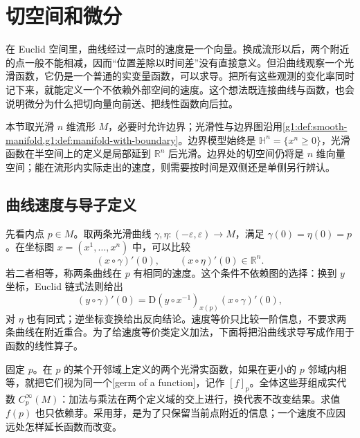 
% 
% 

\section{切空间和微分}
\label{g1:sec:1102}

在 Euclid 空间里，曲线经过一点时的速度是一个向量。换成流形以后，两个附近的点一般不能相减，因而“位置差除以时间差”没有直接意义。但沿曲线观察一个光滑函数，它仍是一个普通的实变量函数，可以求导。把所有这些观测的变化率同时记下来，就能定义一个不依赖外部空间的速度。这个想法既连接曲线与函数，也会说明微分为什么把切向量向前送、把线性函数向后拉。

\ProseParagraphBreak

本节取光滑 \(n\) 维流形 \(M\)，必要时允许边界；光滑性与边界图沿用\cref{g1:def:smooth-manifold,g1:def:manifold-with-boundary}。边界模型始终是 \(\mathbb H^n=\{x^n\ge0\}\)，光滑函数在半空间上的定义是局部延到 \(\mathbb R^n\) 后光滑。边界处的切空间仍将是 \(n\) 维向量空间；能在流形内实际走出的速度，则需要按时间是双侧还是单侧另行辨认。

\subsection{曲线速度与导子定义}
\label{g1:subsec:1102:01}

先看内点 \(p\in M\)。取两条光滑曲线 \(\gamma,\eta:(-\varepsilon,\varepsilon)\to M\)，满足 \(\gamma(0)=\eta(0)=p\)。在坐标图 \(x=(x^1,\ldots,x^n)\) 中，可以比较
\[
	(x\circ\gamma)'(0),\qquad (x\circ\eta)'(0)\in\mathbb R^n.
\]
若二者相等，称两条曲线在 \(p\) 有相同的速度。这个条件不依赖图的选择：换到 \(y\) 坐标，Euclid 链式法则给出
\[
	(y\circ\gamma)'(0)
	=\mathrm{D}(y\circ x^{-1})_{x(p)}(x\circ\gamma)'(0),
\]
对 \(\eta\) 也有同式；逆坐标变换给出反向结论。速度等价只比较一阶信息，不要求两条曲线在附近重合。为了给速度等价类定义加法，下面将把沿曲线求导写成作用于函数的线性算子。

\ProseParagraphBreak

固定 \(p\)。在 \(p\) 的某个开邻域上定义的两个光滑实函数，如果在更小的 \(p\) 邻域内相等，就把它们视为同一个[germ of a function]，记作 \([f]_p\)。全体这些芽组成实代数 \(C^\infty_p(M)\)：加法与乘法在两个定义域的交上进行，换代表不改变结果。求值 \(f(p)\) 也只依赖芽。采用芽，是为了只保留当前点附近的信息；一个速度不应因远处怎样延长函数而改变。

